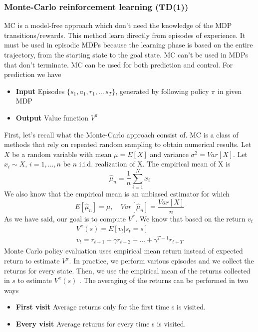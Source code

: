 \documentclass[../main.tex]{subfiles}
\begin{document}
\subsubsection{Monte-Carlo reinforcement learning (TD(1))}
MC is a model-free approach which don't need the knowledge of the MDP transitions/rewards. This method learn directly from episodes of experience. It must be used in episodic MDPs\footnotemark {} because the learning phase is based on the entire trajectory\footnotemark, from the starting state to the goal state. MC can't be used in MDPs that don't terminate.
MC can be used for both prediction and control. For prediction we have
\begin{itemize}
    \item \textbf{Input} Episodes $\{ s_1,a_1,r_1,\dots\,s_T \}$, generated by following policy $\pi$ in given MDP
    \item \textbf{Output} Value function $V^{\pi}$
\end{itemize}
First, let's recall what the Monte-Carlo approach consist of. MC is a class of methods that rely on repeated random sampling to obtain numerical results. Let $X$ be a random variable with mean $\mu = E[X]$ and variance $\sigma^2 = Var[X]$. Let $x_i \sim X$, $i=1,\dots,n$ be $n$ i.i.d. realization of X.
\newline
The empirical mean of X is
\begin{equation*}
    \hat{\mu}_n = \frac{1}{n} \sum_{i=1}^N x_i
\end{equation*}
We also know that the empirical mean is an unbiased estimator for which
\begin{equation*}
    E[\hat{\mu}_n] = \mu, \quad Var[\hat{\mu}_n] = \frac{Var[X]}{n}
\end{equation*}
\newline
As we have said, our goal is to compute $V^{\pi}$. We know that based on the return $v_t$
\begin{align*}
    V^{\pi}(s) = E[v_t|s_t=s] \\
    v_t = r_{t+1} + \gamma r_{t+2} + \dots + \gamma^{T-1} r_{t+T}
\end{align*}
Monte Carlo policy evaluation uses empirical mean return instead of
expected return to estimate $V^{\pi}$. In practice, we perform various episodes and we collect the returns for every state. Then, we use the empirical mean of the returns collected in $s$ to estimate $V^{\pi}(s)$ .
The averaging of the returns can be performed in two ways
\begin{itemize}
    \item \textbf{First visit} Average returns only for the first time s is visited.
    \item \textbf{Every visit} Average returns for every time s is visited.
\end{itemize}
\end{document}
